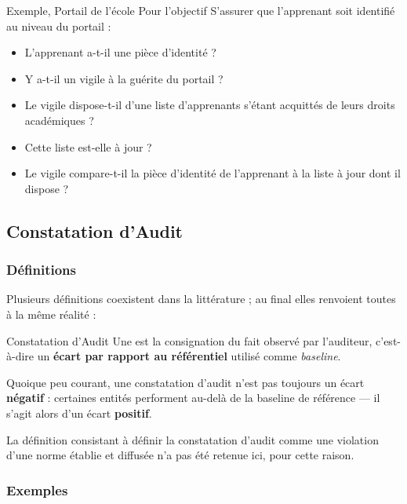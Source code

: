 \begin{boxlizbiz}{Exemple, Portail de l'école}
Pour l'objectif \og S'assurer que l'apprenant soit identifié au niveau du portail \fg{} :
\begin{itemize}
  \item L'apprenant a-t-il une pièce d'identité ?
  \item Y a-t-il un vigile à la guérite du portail ?
  \item Le vigile dispose-t-il d'une liste d'apprenants s'étant acquittés de leurs droits
    académiques ?
  \item Cette liste est-elle à jour ?
  \item Le vigile compare-t-il la pièce d'identité de l'apprenant à la liste à jour dont
    il dispose ?
\end{itemize}
\end{boxlizbiz}

\subsection{Constatation d'Audit}

\subsubsection{Définitions}

Plusieurs définitions coexistent dans la littérature ; au final elles renvoient toutes
à la même réalité :

\begin{boxdef}{Constatation d'Audit}
Une  est la consignation du fait observé par l'auditeur,
c'est-à-dire un \textbf{écart par rapport au référentiel} utilisé comme
\textit{baseline}.

Quoique peu courant, une constatation d'audit n'est pas toujours un écart
\textbf{négatif} : certaines entités performent au-delà de la baseline de référence —
il s'agit alors d'un écart \textbf{positif}.
\end{boxdef}

La définition consistant à définir la constatation d'audit comme une violation d'une
norme établie et diffusée n'a pas été retenue ici, pour cette raison.

\subsubsection{Exemples}

